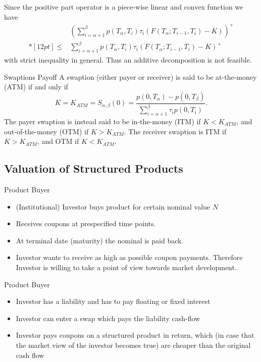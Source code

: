 Since the positive part operator is a
piece-wise linear and convex function we have
$$\begin{array}{ll}
&\displaystyle
\left(\sum_{i=\alpha+1}^{\beta}p(T_{\alpha},T_i)\tau_i(F(T_{\alpha};T_{i-1},T_i)-K)\right)^+\\*[12pt]
\leq&\displaystyle \sum_{i=\alpha+1}^{\beta}p(T_{\alpha},T_i)\tau_i(F(T_{\alpha};T_{i-1},T_i)-K)^+
\end{array}
$$
with strict inequality in general. Thus an additive decomposition is not
feasible.



{Swaptions Payoff}
A swaption (either payer or receiver) is said to be at-the-money
(ATM) if and only if
$$
K=K_{ATM}=S_{\alpha,\beta}(0)=\frac{p(0,T_{\alpha})-p(0,T_{\beta})}{\sum_{i=\alpha+1}^{\beta}\tau_ip(0,T_i)}.
$$
The payer swaption is instead said to be in-the-money (ITM) if
$K<K_{ATM}$, and out-of-the-money (OTM) if $K>K_{ATM}$. The
receiver swaption is ITM if $K>K_{ATM}$, and OTM if $K<K_{ATM}$.

\subsection{Valuation of Structured Products}

{Product Buyer}
\begin{itemize}
\item<1-> (Institutional) Investor buys product for certain nominal value $N$
\item<2-> Receives coupons at prespecified time points.
\item<3-> At terminal date (maturity) the nominal is paid back.
\item<4-> Investor wants to receive as high as possible coupon payments. Therefore Investor is willing to take a point of view towards market development.
\end{itemize}


{Product Buyer}
\begin{itemize}
\item<1-> Investor has a liability and has to pay floating or fixed interest
\item<2-> Investor can enter a swap which pays the liability cash-flow
\item<3-> Investor pays coupons on a structured product in return, which (in case that the market view of the investor becomes true) are cheaper than the original cash flow
\end{itemize}

